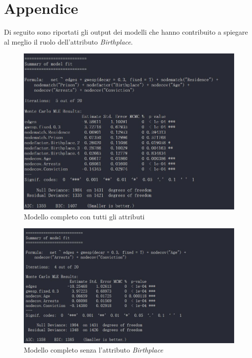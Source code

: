 \documentclass[11pt,a4paper]{report}
\begin{document}
\chapter*{Appendice}
Di seguito sono riportati gli output dei modelli che hanno contribuito a spiegare al meglio il ruolo dell'attributo \emph{Birthplace}.
\begin{figure}[H]
	\centering
	\includegraphics[scale =0.7]{modcov}
	\caption{Modello completo con tutti gli attributi }
		
\end{figure}
\begin{figure}[H]
	\centering
	\includegraphics[scale =0.7]{modcov3}
	\caption{Modello completo senza l'attributo \emph{Birthplace} }
\end{figure}
\end{document}
